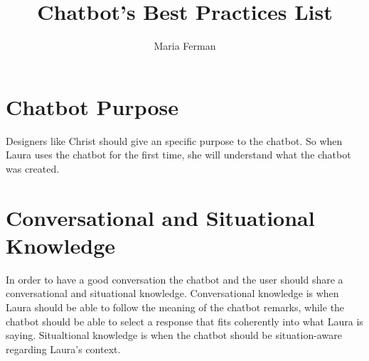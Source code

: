\documentclass[a4paper,10pt]{article}
\title{Chatbot's Best Practices List}
\author{Maria Ferman}
\begin{document}
\maketitle
\section{Chatbot Purpose}

Designers like Christ should give an specific purpose to the chatbot. So when Laura uses the chatbot for the first time, she will understand what the chatbot was created.

\section{Conversational and Situational Knowledge}

In order to have a good conversation the chatbot and the user should share a conversational and situational knowledge.  Conversational knowledge is when Laura should be able to follow the meaning of the chatbot remarks, while the chatbot should be able to select a response that fits coherently into what Laura is saying. Situaltional knowledge is when the chatbot should be situation-aware regarding Laura’s context.



\medskip


\end{document}
